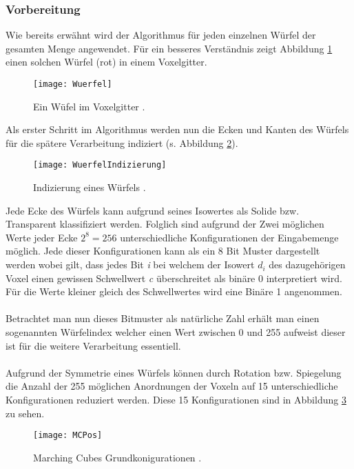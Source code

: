 \subsubsection{Vorbereitung}
Wie bereits erwähnt wird der Algorithmus für jeden einzelnen Würfel der gesamten Menge angewendet. Für ein besseres Verständnis zeigt Abbildung \ref{fig:Wuerfel} einen solchen Würfel (rot) in einem Voxelgitter.
\begin{figure}[H]
	\centering
	\texttt{[image: Wuerfel]}
	\caption{Ein Wüfel im Voxelgitter \citep{SeibtBak}.}
	\label{fig:Wuerfel}
\end{figure}
\noindent Als erster Schritt im Algorithmus werden nun die Ecken und Kanten des Würfels für die spätere Verarbeitung indiziert (s. Abbildung \ref{fig:WuerfelIndizierung}).
\begin{figure}[H]
	\centering
	\texttt{[image: WuerfelIndizierung]}
	\caption{Indizierung eines Würfels \citep{SeibtBak}.}
	\label{fig:WuerfelIndizierung}
\end{figure}

\noindent Jede Ecke des Würfels kann aufgrund seines Isowertes als Solide bzw. Transparent klassifiziert werden. Folglich sind aufgrund der Zwei möglichen Werte jeder Ecke $2^{8} = 256$ unterschiedliche Konfigurationen der Eingabemenge möglich. Jede dieser Konfigurationen kann als ein 8 Bit Muster dargestellt werden wobei gilt, dass jedes Bit \textit{i} bei welchem der Isowert \textit{$d_{i}$} des dazugehörigen Voxel einen gewissen Schwellwert \textit{c} überschreitet als binäre 0 interpretiert wird. Für die Werte kleiner gleich des Schwellwertes wird eine Binäre 1 angenommen.\\\\ Betrachtet man nun dieses Bitmuster als natürliche Zahl erhält man einen sogenannten Würfelindex welcher einen Wert zwischen 0  und 255 aufweist dieser ist für die weitere Verarbeitung essentiell.\\
\\
Aufgrund der Symmetrie eines Würfels können durch Rotation bzw. Spiegelung die Anzahl der 255 möglichen Anordnungen der Voxeln auf 15 unterschiedliche Konfigurationen reduziert werden. Diese 15 Konfigurationen sind in Abbildung \ref{fig:MCPos} zu sehen.

\begin{figure}[H]
	\centering
	\texttt{[image: MCPos]}
	\caption{Marching Cubes Grundkonigurationen \citep{MCAlgo}.}
	\label{fig:MCPos}
\end{figure}

